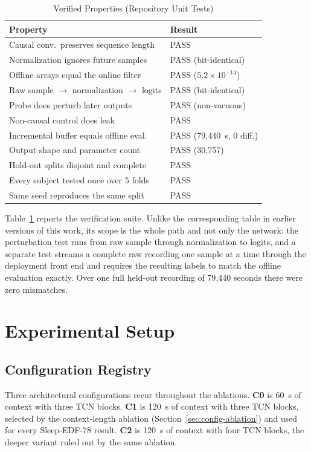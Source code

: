 \documentclass[conference]{IEEEtran}
\begin{document}
\begin{table}[t]
\caption{Verified Properties (Repository Unit Tests)}
\label{tab:verified}
\centering
\footnotesize
\begin{tabular}{@{}p{}l@{}}
\toprule
Property & Result \\
\midrule
Causal conv.\ preserves sequence length & PASS \\
Normalization ignores future samples & PASS (bit-identical) \\
Offline arrays equal the online filter & PASS ($5.2\times10^{-14}$) \\
Raw sample $\to$ normalization $\to$ logits & PASS (bit-identical) \\
Probe does perturb later outputs & PASS (non-vacuous) \\
Non-causal control does leak & PASS \\
Incremental buffer equals offline eval. & PASS (79{,}440~s, 0 diff.) \\
Output shape and parameter count & PASS (30{,}757) \\
Hold-out splits disjoint and complete & PASS \\
Every subject tested once over 5 folds & PASS \\
Same seed reproduces the same split & PASS \\
\bottomrule
\end{tabular}
\end{table}

Table~\ref{tab:verified} reports the verification suite. Unlike the corresponding table in earlier
versions of this work, its scope is the whole path and not only the network: the perturbation test
runs from raw sample through normalization to logits, and a separate test streams a complete raw
recording one sample at a time through the deployment front end and requires the resulting labels
to match the offline evaluation exactly. Over one full held-out recording of 79{,}440 seconds there
were zero mismatches.

\section{Experimental Setup}

\subsection{Configuration Registry}

Three architectural configurations recur throughout the ablations. \textbf{C0} is 60~s of context
with three TCN blocks. \textbf{C1} is 120~s of context with three TCN blocks, selected by the
context-length ablation (Section~\ref{sec:config-ablation}) and used for every Sleep-EDF-78 result.
\textbf{C2} is 120~s of context with four TCN blocks, the deeper variant ruled out by the same
ablation.
\end{document}
